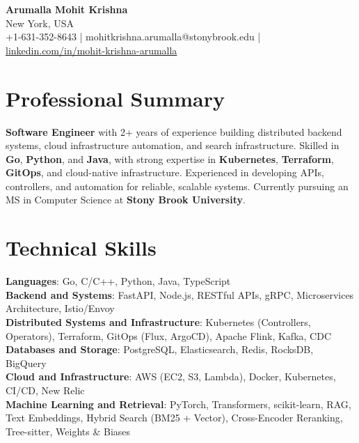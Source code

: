 \documentclass[letterpaper,11pt]{article}
\begin{document}
\begin{center}
  {\Large \textbf{Arumalla Mohit Krishna}} \\
  New York, USA \\
  +1-631-352-8643 \enspace | \enspace mohitkrishna.arumalla@stonybrook.edu \enspace | \enspace \href{https://www.linkedin.com/in/mohit-krishna-arumalla}{linkedin.com/in/mohit-krishna-arumalla}
\end{center}

\section{Professional Summary}
  \begin{itemize}[leftmargin=0.15in, label={}]
    \small{\item{
     \textbf{Software Engineer} with 2+ years of experience building distributed backend systems, cloud infrastructure automation, and search infrastructure. Skilled in \textbf{Go}, \textbf{Python}, and \textbf{Java}, with strong expertise in \textbf{Kubernetes}, \textbf{Terraform}, \textbf{GitOps}, and cloud-native infrastructure. Experienced in developing APIs, controllers, and automation for reliable, scalable systems. Currently pursuing an MS in Computer Science at \textbf{Stony Brook University}.
    }}
  \end{itemize}
\vspace{-16pt}

\section{Technical Skills}
 \begin{itemize}[leftmargin=0.15in, label={}]
    \small{\item{
     \textbf{Languages}: Go, C/C++, Python, Java, TypeScript \\
     \textbf{Backend and Systems}: FastAPI, Node.js, RESTful APIs, gRPC, Microservices Architecture, Istio/Envoy \\
     \textbf{Distributed Systems and Infrastructure}: Kubernetes (Controllers, Operators), Terraform, GitOps (Flux, ArgoCD), Apache Flink, Kafka, CDC \\
     \textbf{Databases and Storage}: PostgreSQL, Elasticsearch, Redis, RocksDB, BigQuery \\
     \textbf{Cloud and Infrastructure}: AWS (EC2, S3, Lambda), Docker, Kubernetes, CI/CD, New Relic \\
     \textbf{Machine Learning and Retrieval}: PyTorch, Transformers, scikit-learn, RAG, Text Embeddings, Hybrid Search (BM25 + Vector), Cross-Encoder Reranking, Tree-sitter, Weights \& Biases
    }}
 \end{itemize}
\vspace{-16pt}
\end{document}
